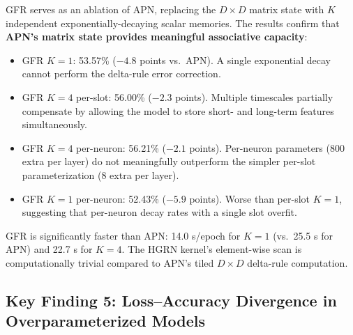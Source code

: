 \documentclass[11pt,a4paper]{article}
\begin{document}
GFR serves as an ablation of APN, replacing the $D \times D$ matrix state with $K$ independent exponentially-decaying scalar memories.
The results confirm that \textbf{APN's matrix state provides meaningful associative capacity}:
\begin{itemize}
\item GFR $K{=}1$: 53.57\% ($-4.8$ points vs.\ APN). A single exponential decay cannot perform the delta-rule error correction.
\item GFR $K{=}4$ per-slot: 56.00\% ($-2.3$ points). Multiple timescales partially compensate by allowing the model to store short- and long-term features simultaneously.
\item GFR $K{=}4$ per-neuron: 56.21\% ($-2.1$ points). Per-neuron parameters (800 extra per layer) do not meaningfully outperform the simpler per-slot parameterization (8 extra per layer).
\item GFR $K{=}1$ per-neuron: 52.43\% ($-5.9$ points). Worse than per-slot $K{=}1$, suggesting that per-neuron decay rates with a single slot overfit.
\end{itemize}

GFR is significantly faster than APN: 14.0 s/epoch for $K{=}1$ (vs.\ 25.5 s for APN) and 22.7 s for $K{=}4$.
The HGRN kernel's element-wise scan is computationally trivial compared to APN's tiled $D \times D$ delta-rule computation.

\subsection{Key Finding 5: Loss--Accuracy Divergence in Overparameterized Models}
\label{sec:loss_divergence}
\end{document}
